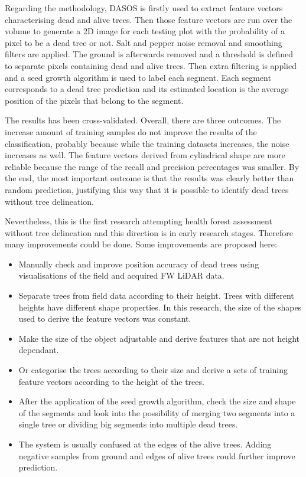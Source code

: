 \documentclass{subfiles}
\begin{document}
\par Regarding the methodology, DASOS is firstly used to extract feature vectors characterising dead and alive trees. Then those feature vectors are run over the volume to generate a 2D image for each testing plot with the probability of a pixel to be a dead tree or not. Salt and pepper noise removal and smoothing filters are applied. The ground is afterwards removed and a threshold is defined to separate pixels containing dead and alive trees. Then extra filtering is applied and a seed growth algorithm is used to label each segment. Each segment corresponds to a dead tree prediction and its estimated location is the average position of the pixels that belong to the segment. 

\par The results has been cross-validated. Overall, there are three outcomes. The increase amount of training samples do not improve the results of the classification, probably because while the training datasets increases, the noise increases as well. The feature vectors derived from cylindrical shape are more reliable because the range of the recall and precision percentages was smaller. By the end, the most important outcome is that the results was clearly better than random prediction, justifying this way that it is possible to identify dead trees without tree delineation.

\par  Nevertheless, this is the first research attempting health forest assessment without tree delineation and this direction is in early research stages. Therefore many improvements could be done. Some improvements are proposed here: 

\begin{itemize}
	\item Manually check and improve position accuracy of dead trees using visualisations of the field and acquired FW LiDAR data. 
	\item Separate trees from field data according to their height. Trees with different heights have different shape properties. In this research, the size of the shapes used to derive the feature vectors was constant.
	\item Make the size of the object adjustable and derive features that are not height dependant.
	\item Or categorise the trees according to their size and derive a sets of training feature vectors according to the height of the trees.
	\item After the application of the seed growth algorithm, check the size and shape of the segments and look into the possibility of merging two segments into a single tree or dividing big segments into multiple dead trees.
	\item The system is usually confused at the edges of the alive trees. Adding negative samples from ground and edges of alive trees could further improve prediction. 
\end{itemize}
\end{document}
